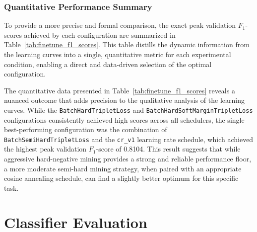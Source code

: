 \subsubsection{Quantitative Performance Summary}
To provide a more precise and formal comparison, the exact peak validation \(F_1\)-scores achieved by each configuration are summarized in Table~\ref{tab:finetune_f1_scores}. This table distills the dynamic information from the learning curves into a single, quantitative metric for each experimental condition, enabling a direct and data-driven selection of the optimal configuration.
\begin{table}[tb]
    \captionsetup{skip=5pt}
    \centering
    \caption{Peak Validation F1-Score of Fine-Tuning Configurations on BGE Model}
    \label{tab:finetune_f1_scores}
\end{table}
The quantitative data presented in Table~\ref{tab:finetune_f1_scores} reveals a nuanced outcome that adds precision to the qualitative analysis of the learning curves. While the \verb|BatchHardTripletLoss| and \verb|BatchHardSoftMarginTripletLoss| configurations consistently achieved high scores across all schedulers, the single best-performing configuration was the combination of \verb|BatchSemiHardTripletLoss| and the \verb|cr_v1| learning rate schedule, which achieved the highest peak validation \(F_1\)-score of 0.8104. This result suggests that while aggressive hard-negative mining provides a strong and reliable performance floor, a more moderate semi-hard mining strategy, when paired with an appropriate cosine annealing schedule, can find a slightly better optimum for this specific task.

\section{Classifier Evaluation}

